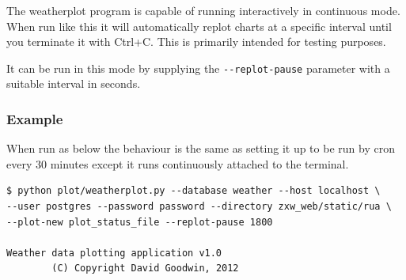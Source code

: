 \documentclass[a4paper,10pt,draft]{book}
\begin{document}
The weatherplot program is capable of running interactively in continuous mode. When run like this it will automatically replot charts at a specific interval until you terminate it with Ctrl+C. This is primarily intended for testing purposes.

It can be run in this mode by supplying the \verb|--replot-pause| parameter
with a suitable interval in seconds.

\subsubsection{Example}

When run as below the behaviour is the same as setting it up to be run by cron every 30 minutes except it runs continuously attached to the terminal.

\begin{verbatim}
$ python plot/weatherplot.py --database weather --host localhost \
--user postgres --password password --directory zxw_web/static/rua \
--plot-new plot_status_file --replot-pause 1800

Weather data plotting application v1.0
        (C) Copyright David Goodwin, 2012



\end{verbatim}
\end{document}
